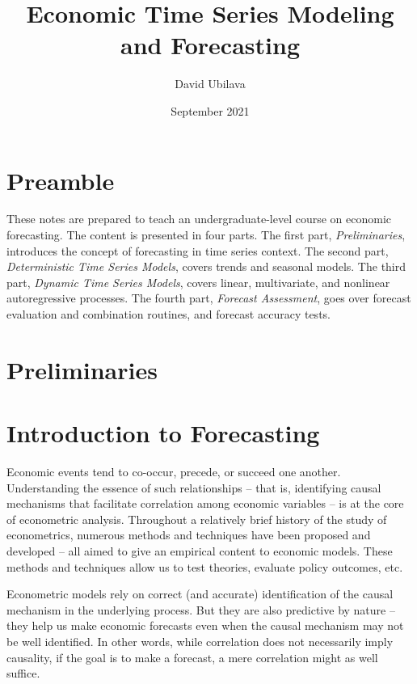 \documentclass[
  oneside]{book}
\title{Economic Time Series Modeling and Forecasting}
\author{David Ubilava}
\date{September 2021}
\begin{document}
\maketitle

{
\setcounter{tocdepth}{1}
\tableofcontents
}
\hypertarget{preamble}{%
\chapter*{Preamble}\label{preamble}}

These notes are prepared to teach an undergraduate-level course on economic forecasting. The content is presented in four parts. The first part, \emph{Preliminaries}, introduces the concept of forecasting in time series context. The second part, \emph{Deterministic Time Series Models}, covers trends and seasonal models. The third part, \emph{Dynamic Time Series Models}, covers linear, multivariate, and nonlinear autoregressive processes. The fourth part, \emph{Forecast Assessment}, goes over forecast evaluation and combination routines, and forecast accuracy tests.

\hypertarget{preliminaries}{%
\chapter*{Preliminaries}\label{preliminaries}}

\hypertarget{introduction-to-forecasting}{%
\chapter{Introduction to Forecasting}\label{introduction-to-forecasting}}

Economic events tend to co-occur, precede, or succeed one another. Understanding the essence of such relationships -- that is, identifying causal mechanisms that facilitate correlation among economic variables -- is at the core of econometric analysis. Throughout a relatively brief history of the study of econometrics, numerous methods and techniques have been proposed and developed -- all aimed to give an empirical content to economic models. These methods and techniques allow us to test theories, evaluate policy outcomes, etc.

Econometric models rely on correct (and accurate) identification of the causal mechanism in the underlying process. But they are also predictive by nature -- they help us make economic forecasts even when the causal mechanism may not be well identified. In other words, while correlation does not necessarily imply causality, if the goal is to make a forecast, a mere correlation might as well suffice.
\end{document}
